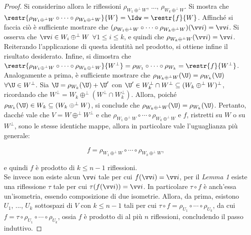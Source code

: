 \documentclass[11pt]{article}
\begin{document}
\begin{proof}
		Si considerino allora le riflessioni $\rho_{W_1 \oplus^\perp W}$, ..., $\rho_{W_k \oplus^\perp W}$.
		Si mostra che $\restr{\rho_{W_1 \oplus^\perp W} \circ \cdots \circ \rho_{W_k \oplus^\perp W}}{W} = \Idw = \restr{f}{W}$.
		Affinché si faccia ciò è sufficiente mostrare che $(\rho_{W_1 \oplus^\perp W} \circ \cdots \circ \rho_{W_k \oplus^\perp W})(\vv i) = \vv i$. Si osserva che $\vv i \in W_i \oplus^\perp W$ $\forall 1 \leq i \leq k$, e
		quindi che $\rho_{W_k \oplus^\perp W}(\vv i) = \vv i$. Reiterando l'applicazione di questa identità nel prodotto,
		si ottiene infine il risultato desiderato. Infine, si dimostra che $\restr{\rho_{W_1 \oplus^\perp W} \circ \cdots \circ \rho_{W_k \oplus^\perp W}}{W^\perp} = \rho_{W_1} \circ \cdots \circ \rho_{W_k} = \restr{f}{W^\perp}$. Analogamente a prima,
		è sufficiente mostrare che $\rho_{W_k \oplus^\perp W}(\U) = \rho_{W_k}(\U)$ $\forall \U \in W^\perp$.
		Sia $\U = \rho_{W_k}(\U) + \U'$ con $\U' \in W_k^\perp \cap W^\perp \subseteq (W_k \oplus^\perp W)^\perp$,
		ricordando che $W^\perp = W_k \oplus^\perp (W^\perp \cap W_k^\perp)$.
		Allora, poiché $\rho_{W_k}(\U) \in W_k \subseteq (W_k \oplus^\perp W)$, si conclude che
		$\rho_{W_k \oplus^\perp W}(\U) = \rho_{W_k}(\U)$. Pertanto, dacché vale che $V = W \oplus^\perp W^\perp$ e che $\rho_{W_1 \oplus^\perp W} \circ \cdots \circ \rho_{W_k \oplus^\perp W}$ e $f$, ristretti su $W$ o su $W^\perp$, sono le stesse identiche mappe, allora
		in particolare vale l'uguaglianza più generale:
			
		\[ f = \rho_{W_1 \oplus^\perp W} \circ \cdots \circ \rho_{W_k \oplus^\perp W}, \]
			
		\vskip 0.05in
				
		e quindi $f$ è prodotto di $k \leq n-1$ riflessioni. \\
		
		Se invece non esiste alcun $\vv i$ tale per cui $f(\vv i) = \vv i$, per il \textit{Lemma 1} esiste
		una riflessione $\tau$ tale per cui $\tau(f(\vv i)) = \vv i$. In particolare $\tau \circ f$ è anch'essa
		un'isometria, essendo composizione di due isometrie. Allora, da prima, esistono $U_1$, ..., $U_k$ sottospazi
		di $V$ con $k \leq n-1$ tali per cui $\tau \circ f = \rho_{U_1} \circ \cdots \circ \rho_{U_k}$, da
		cui $f = \tau \circ \rho_{U_1} \circ \cdots \circ \rho_{U_k}$, ossia $f$ è prodotto di al più
		$n$ riflessioni, concludendo il passo induttivo.
	\end{proof}
	
	\setcounter{lemma}{0}
	
	\hr
	
\end{document}
